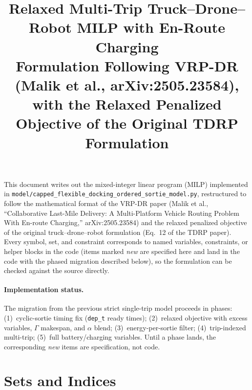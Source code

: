 \documentclass[10pt]{article}
\title{Relaxed Multi-Trip Truck--Drone--Robot MILP with En-Route Charging\\
\large Formulation Following VRP-DR (Malik et al., arXiv:2505.23584),\\
\large with the Relaxed Penalized Objective of the Original TDRP Formulation}
\author{}
\date{}
\begin{document}
\maketitle

\noindent This document writes out the mixed-integer linear program (MILP)
implemented in \texttt{model/capped\_flexible\_docking\_ordered\_sortie\_model.py},
restructured to follow the mathematical format of the VRP-DR paper
(Malik et al., ``Collaborative Last-Mile Delivery: A Multi-Platform Vehicle
Routing Problem With En-route Charging,'' arXiv:2505.23584) and the relaxed
penalized objective of the original truck--drone--robot formulation (Eq.~12 of
the TDRP paper). Every symbol, set, and constraint corresponds to named
variables, constraints, or helper blocks in the code (items marked
\emph{new} are specified here and land in the code with the phased migration
described below), so the formulation can be checked against the source
directly.

\paragraph{Implementation status.} The migration from the previous strict
single-trip model proceeds in phases: (1)~cyclic-sortie timing fix
(\texttt{dep\_t} ready times); (2)~relaxed objective with excess variables,
$\Gamma$ makespan, and $\alpha$ blend; (3)~energy-per-sortie filter;
(4)~trip-indexed multi-trip; (5)~full battery/charging variables. Until a phase
lands, the corresponding \emph{new} items are specification, not code.

\section{Sets and Indices}
\label{sec:sets}
\end{document}
